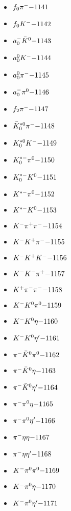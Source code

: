 \begin{multicols}{3}
\begin{itemize}
 \item $ f_{0} \pi^{-} \hfill{-1141}$
 \item $ f_{0} K^{-} \hfill{-1142}$
 \item $ a_{0}^{-} \bar{K}^{0} \hfill{-1143}$
 \item $ a_{0}^{0} K^{-} \hfill{-1144}$
 \item $ a_{0}^{0} \pi^{-} \hfill{-1145}$
 \item $ a_{0}^{-} \pi^{0} \hfill{-1146}$
 \item $ f_{2} \pi^{-} \hfill{-1147}$
 \item $ \bar{K}_{0}^{*0} \pi^{-} \hfill{-1148}$
 \item $ K_{0}^{*0} K^{-} \hfill{-1149}$
 \item $ K_{0}^{*-} \pi^{0} \hfill{-1150}$
 \item $ K_{0}^{*-} K^{0} \hfill{-1151}$
 \item $ K^{*-} \pi^{0} \hfill{-1152}$
 \item $ K^{*-} K^{0} \hfill{-1153}$
 \item $ K^{-} \pi^{+} \pi^{-} \hfill{-1154}$
 \item $ K^{-} K^{+} \pi^{-} \hfill{-1155}$
 \item $ K^{-} K^{+} K^{-} \hfill{-1156}$
 \item $ K^{-} K^{-} \pi^{+} \hfill{-1157}$
 \item $ K^{+} \pi^{-} \pi^{-} \hfill{-1158}$
 \item $ K^{-} K^{0} \pi^{0} \hfill{-1159}$
 \item $ K^{-} K^{0} \eta \hfill{-1160}$
 \item $ K^{-} K^{0} {\eta^{\prime}} \hfill{-1161}$
 \item $ \pi^{-} \bar{K}^{0} \pi^{0} \hfill{-1162}$
 \item $ \pi^{-} \bar{K}^{0} \eta \hfill{-1163}$
 \item $ \pi^{-} \bar{K}^{0} {\eta^{\prime}} \hfill{-1164}$
 \item $ \pi^{-} \pi^{0} \eta \hfill{-1165}$
 \item $ \pi^{-} \pi^{0} {\eta^{\prime}} \hfill{-1166}$
 \item $ \pi^{-} \eta \eta \hfill{-1167}$
 \item $ \pi^{-} \eta {\eta^{\prime}} \hfill{-1168}$
 \item $ K^{-} \pi^{0} \pi^{0} \hfill{-1169}$
 \item $ K^{-} \pi^{0} \eta \hfill{-1170}$
 \item $ K^{-} \pi^{0} {\eta^{\prime}} \hfill{-1171}$

\end{itemize}
\end{multicols}
